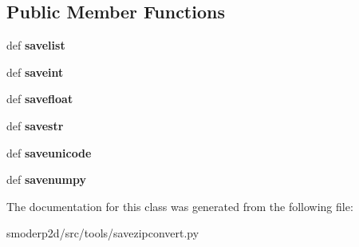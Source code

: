 \subsection*{Public Member Functions}
\begin{DoxyCompactItemize}
\item 
\hypertarget{classsmoderp2d_1_1src_1_1tools_1_1savezipconvert_1_1SaveItems_a88cd7dcb985be92294af1443ecf46573}{def {\bfseries savelist}}\label{classsmoderp2d_1_1src_1_1tools_1_1savezipconvert_1_1SaveItems_a88cd7dcb985be92294af1443ecf46573}

\item 
\hypertarget{classsmoderp2d_1_1src_1_1tools_1_1savezipconvert_1_1SaveItems_abffb863fffb5c4184101afdb2c343119}{def {\bfseries saveint}}\label{classsmoderp2d_1_1src_1_1tools_1_1savezipconvert_1_1SaveItems_abffb863fffb5c4184101afdb2c343119}

\item 
\hypertarget{classsmoderp2d_1_1src_1_1tools_1_1savezipconvert_1_1SaveItems_a89063838b17949e6152947ce1f3ef90b}{def {\bfseries savefloat}}\label{classsmoderp2d_1_1src_1_1tools_1_1savezipconvert_1_1SaveItems_a89063838b17949e6152947ce1f3ef90b}

\item 
\hypertarget{classsmoderp2d_1_1src_1_1tools_1_1savezipconvert_1_1SaveItems_a8b9a04c1bda1b67c17a8f680ab6a83c9}{def {\bfseries savestr}}\label{classsmoderp2d_1_1src_1_1tools_1_1savezipconvert_1_1SaveItems_a8b9a04c1bda1b67c17a8f680ab6a83c9}

\item 
\hypertarget{classsmoderp2d_1_1src_1_1tools_1_1savezipconvert_1_1SaveItems_a95863c1b617a2cfecf2502a1150651d8}{def {\bfseries saveunicode}}\label{classsmoderp2d_1_1src_1_1tools_1_1savezipconvert_1_1SaveItems_a95863c1b617a2cfecf2502a1150651d8}

\item 
\hypertarget{classsmoderp2d_1_1src_1_1tools_1_1savezipconvert_1_1SaveItems_a17acf5ee275ad2da8483d2624d983bf1}{def {\bfseries savenumpy}}\label{classsmoderp2d_1_1src_1_1tools_1_1savezipconvert_1_1SaveItems_a17acf5ee275ad2da8483d2624d983bf1}

\end{DoxyCompactItemize}


The documentation for this class was generated from the following file\-:\begin{DoxyCompactItemize}
\item 
smoderp2d/src/tools/savezipconvert.\-py\end{DoxyCompactItemize}
